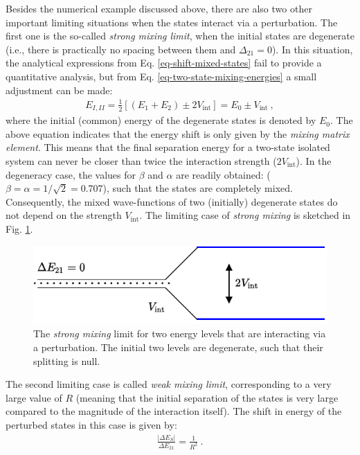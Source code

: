 Besides the numerical example discussed above, there are also two other important limiting situations when the states interact via a perturbation. The first one is the so-called \emph{strong mixing limit}, when the initial states are degenerate (i.e., there is practically no spacing between them and $\Delta_{21}=0$). In this situation, the analytical expressions from Eq. \ref{eq-shift-mixed-states} fail to provide a quantitative analysis, but from Eq. \ref{eq-two-state-mixing-energies} a small adjustment can be made:
\begin{align}
    E_{I,II}=\frac{1}{2}\left[(E_1+E_2)\pm2V_\text{int}\right]=E_0\pm V_\text{int}\ ,
\end{align}
where the initial (common) energy of the degenerate states is denoted by $E_0$. The above equation indicates that the energy shift is only given by the \emph{mixing matrix element}. This means that the final separation energy for a two-state isolated system can never be closer than twice the interaction strength ($2V_\text{int}$). In the degeneracy case, the values for $\beta$ and $\alpha$ are readily obtained: ($\beta=\alpha=1/\sqrt{2}=0.707$), such that the states are completely mixed. Consequently, the mixed wave-functions of two (initially) degenerate states do not depend on the strength $V_\text{int}$. The limiting case of \emph{strong mixing} is sketched in Fig. \ref{strong-mixing-fig}.
\begin{figure}
    \centering
    \includegraphics[scale=0.95]{Chapters/Figures/mixing_strong_coupling.pdf}
    \caption{The \emph{strong mixing} limit for two energy levels that are interacting via a perturbation. The initial two levels are degenerate, such that their splitting is null.}
    \label{strong-mixing-fig}
\end{figure}

The second limiting case is called \emph{weak mixing limit}, corresponding to a very large value of $R$ (meaning that the initial separation of the states is very large compared to the magnitude of the interaction itself). The shift in energy of the perturbed states in this case is given by:
\begin{align}
    \frac{|\Delta E_S|}{\Delta E_{21}}=\frac{1}{R^2}\ .
\end{align}

